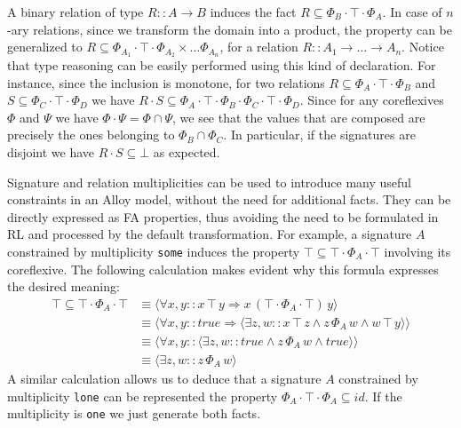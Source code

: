 \documentclass{llncs}
\begin{document}
A binary relation of type $R :: A \rightarrow B$ induces the fact $R
\subseteq \Phi_B \cdot \top \cdot \Phi_A$. In case of $n$-ary relations, since we transform the domain into a product, the property can be generalized to $R \subseteq \Phi_{A_1} \cdot \top \cdot \Phi_{A_2} \times \dots \Phi_{A_n}$, for a relation $R :: A_1 \rightarrow \dots \rightarrow A_n$. Notice that type reasoning can be easily performed using this kind of declaration. For instance,
since the inclusion is monotone, for two relations $R \subseteq \Phi_A
\cdot \top \cdot \Phi_B$ and $S \subseteq \Phi_C \cdot \top \cdot
\Phi_D$ we have $R \cdot S \subseteq \Phi_A \cdot \top \cdot \Phi_B
\cdot \Phi_C \cdot \top \cdot \Phi_D$. Since for any coreflexives
$\Phi$ and $\Psi$ we have $\Phi \cdot \Psi = \Phi \cap \Psi$, we see
that the values that are composed are precisely the ones belonging to
$\Phi_B \cap \Phi_C$. In particular, if the signatures are disjoint we
have $R \cdot S \subseteq \bot$ as expected.


Signature and relation multiplicities can be used to introduce many
useful constraints in an Alloy model, without the need for additional
facts. They can be directly expressed as FA properties, thus avoiding
the need to be formulated in RL and processed by the default
transformation. For example, a signature $A$ constrained by
multiplicity \texttt{some} induces the property $\top \subseteq \top
\cdot \Phi_A \cdot \top$ involving its coreflexive. The following
calculation makes evident why this formula expresses the desired
meaning:
\begin{align*}
  \top \subseteq \top \cdot \Phi_A \cdot \top & \equiv \langle \forall x, y :: x\, \top\, y \Rightarrow x \, (\top \cdot \Phi_A \cdot \top)\, y \rangle\\
  & \equiv \langle \forall x, y :: \mathit{true} \Rightarrow \langle \exists z, w :: x \, \top \, z \wedge z \, \Phi_A \, w \wedge w \, \top\, y \rangle \rangle\\
  & \equiv \langle \forall x, y :: \langle \exists z, w :: \mathit{true} \wedge z \, \Phi_A \, w \wedge \mathit{true} \rangle \rangle\\
  & \equiv \langle \exists z, w :: z \, \Phi_A \, w \rangle
\end{align*}
A similar calculation allows us to deduce that a signature $A$
constrained by multiplicity \texttt{lone} can be represented the
property $\Phi_A \cdot \top \cdot \Phi_A \subseteq id$. If the
multiplicity is \texttt{one} we just generate both facts.
\end{document}
